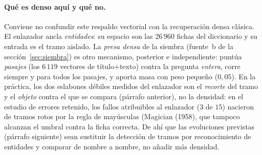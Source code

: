 \documentclass[11pt,a4paper]{article}
\begin{document}
\paragraph{Qué es denso aquí y qué no.}
Conviene no confundir este respaldo vectorial con la recuperación densa
clásica. El enlazador ancla \emph{entidades}: su espacio son las $26\,960$
fichas del diccionario y su entrada es el tramo aislado. La \emph{presa
densa} de la siembra (fuente~b de la sección~\ref{sec:siembra}) es otro
mecanismo, posterior e independiente: puntúa \emph{pasajes} (los $6\,119$
vectores de título$+$texto) contra la pregunta \emph{entera}, corre
siempre y para todos los pasajes, y aporta masa con peso pequeño
($0{,}05$). En la práctica, los dos eslabones débiles medidos del
enlazador son el \emph{recorte} del tramo y el \emph{objeto} contra el
que se compara (párrafo anterior), no la densidad: en el estudio de
errores retenido, los fallos atribuibles al enlazador ($3$ de $15$)
nacieron de tramos rotos por la regla de mayúsculas (\guillemotleft{}Magician
(1958\guillemotright{}), que tampoco alcanzan el umbral contra la ficha correcta. De ahí
que las evoluciones previstas (párrafo siguiente) sean sustituir la
detección de tramos por reconocimiento de entidades y comparar de nombre
a nombre, no añadir más densidad.
\end{document}
